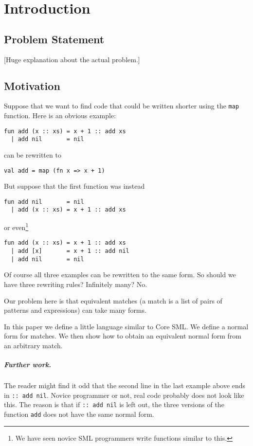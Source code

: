\chapter{Introduction}

\section{Problem Statement}

{\footnotesize [Huge explanation about the actual problem.]}

\section{Motivation}
\label{sec:motivation}
Suppose that we want to find code that could be written shorter using the
\texttt{map} function.
Here is an obvious example:
\begin{lstlisting}
fun add (x :: xs) = x + 1 :: add xs
  | add nil       = nil
\end{lstlisting}
can be rewritten to
\begin{lstlisting}
val add = map (fn x => x + 1)
\end{lstlisting}

But suppose that the first function was instead
\begin{lstlisting}
fun add nil       = nil
  | add (x :: xs) = x + 1 :: add xs
\end{lstlisting}
or even\footnote{We have seen novice SML programmers write functions similar to
  this.}
\begin{lstlisting}
fun add (x :: xs) = x + 1 :: add xs
  | add [x]       = x + 1 :: add nil
  | add nil       = nil
\end{lstlisting}
Of course all three examples can be rewritten to the same form. So should we
have three rewriting rules? Infinitely many? No.

Our problem here is that equivalent matches (a match is a list of pairs of
patterns and expressions) can take many forms.

In this paper we define a little language similar to Core SML. We define a
normal form for matches. We then show how to obtain an equivalent normal form
from an arbitrary match.

\paragraph{Further work.}
The reader might find it odd that the second line in the last example above ends
in \texttt{:: add nil}. Novice programmer or not, real code probably does not
look like this. The reason is that if \texttt{:: add nil} is left out, the three
versions of the function \texttt{add} does not have the same normal form.

